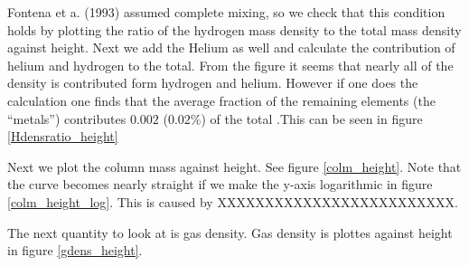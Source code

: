 \documentclass{aa}   %
\begin{document}

Fontena et a. (1993) assumed complete mixing, so we check that this condition holds by plotting the ratio of the hydrogen mass density to the total mass density against height. Next we add the Helium as well and calculate the contribution of helium and hydrogen to the total. From the figure it seems that nearly all of the density is contributed form hydrogen and helium. However if one does the calculation one finds that the average fraction of the remaining elements (the ``metals'') contributes $0.002$ ($0.02 \%$) of the total .This can be seen in figure \ref{Hdensratio_height}

Next we plot the column mass against height. See figure \ref{colm_height}. Note that the curve becomes nearly straight if we make the y-axis logarithmic in figure \ref{colm_height_log}. This is caused by XXXXXXXXXXXXXXXXXXXXXXXXX.


The next quantity to look at is gas density. Gas density is plottes against height in figure \ref{gdens_height}.

\end{document}
